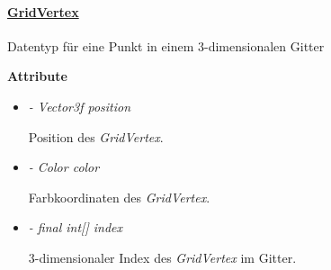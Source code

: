         \paragraph{\underline{GridVertex}} \mbox{}\par
            Datentyp für eine Punkt in einem 3-dimensionalen Gitter\par
        
        \textbf{Attribute}	
        \begin{itemize}
            \item  \textit{- Vector3f position}
                \begin{leftbar}[0.9\linewidth]
                    Position des \textit{GridVertex}.\\
                \end{leftbar}

            \item  \textit{- Color color}
                \begin{leftbar}[0.9\linewidth]
                    Farbkoordinaten des \textit{GridVertex}.\\
                \end{leftbar}

            \item  \textit{- final int[] index}
                \begin{leftbar}[0.9\linewidth]
                    3-dimensionaler Index des \textit{GridVertex} im Gitter.\\
                \end{leftbar}
        \end{itemize}

